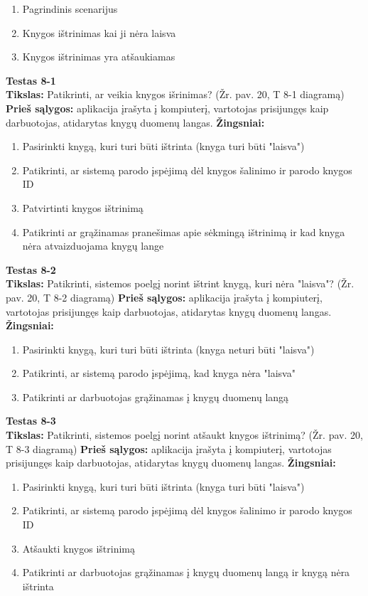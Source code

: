 \documentclass{VUMIFPSkursinis}
\begin{document}
\begin{enumerate}
\item Pagrindinis scenarijus
\item Knygos ištrinimas kai ji nėra laisva
\item Knygos ištrinimas yra atšaukiamas
\end{enumerate}
\hfill \break
\textbf{Testas 8-1}\\
\hfill \break
\textbf{Tikslas:} Patikrinti, ar veikia knygos išrinimas? (Žr. pav. 20, T 8-1 diagramą)
\hfill \break
\hfill \break
\textbf{Prieš sąlygos:} aplikacija įrašyta į kompiuterį, vartotojas prisijungęs kaip darbuotojas, atidarytas knygų duomenų langas.
\hfill \break
\hfill \break
\textbf{Žingsniai:}
\hfill \break
\begin{enumerate}
\item Pasirinkti knygą, kuri turi būti ištrinta (knyga turi būti "laisva")
\item Patikrinti, ar sistemą parodo įspėjimą dėl knygos šalinimo ir parodo knygos ID
\item Patvirtinti knygos ištrinimą
\item Patikrinti ar grąžinamas pranešimas apie sėkmingą ištrinimą ir kad knyga nėra atvaizduojama knygų lange
\end{enumerate}
\hfill \break
\textbf{Testas 8-2}\\
\hfill \break
\textbf{Tikslas:} Patikrinti, sistemos poelgį norint ištrint knygą, kuri nėra "laisva"? (Žr. pav. 20, T 8-2 diagramą)
\hfill \break
\hfill \break
\textbf{Prieš sąlygos:} aplikacija įrašyta į kompiuterį, vartotojas prisijungęs kaip darbuotojas, atidarytas knygų duomenų langas.
\hfill \break
\hfill \break
\textbf{Žingsniai:}
\hfill \break
\begin{enumerate}
\item Pasirinkti knygą, kuri turi būti ištrinta (knyga neturi būti "laisva")
\item Patikrinti, ar sistemą parodo įspėjimą, kad knyga nėra "laisva"
\item Patikrinti ar darbuotojas grąžinamas į knygų duomenų langą
\end{enumerate}
\hfill \break
\textbf{Testas 8-3}\\
\hfill \break
\textbf{Tikslas:} Patikrinti, sistemos poelgį norint atšaukt knygos ištrinimą? (Žr. pav. 20, T 8-3 diagramą)
\hfill \break
\hfill \break
\textbf{Prieš sąlygos:} aplikacija įrašyta į kompiuterį, vartotojas prisijungęs kaip darbuotojas, atidarytas knygų duomenų langas.
\hfill \break
\hfill \break
\textbf{Žingsniai:}
\hfill \break
\begin{enumerate}
\item Pasirinkti knygą, kuri turi būti ištrinta (knyga turi būti "laisva")
\item Patikrinti, ar sistemą parodo įspėjimą dėl knygos šalinimo ir parodo knygos ID
\item Atšaukti knygos ištrinimą
\item Patikrinti ar darbuotojas grąžinamas į knygų duomenų langą ir knygą nėra ištrinta
\end{enumerate}
\end{document}
